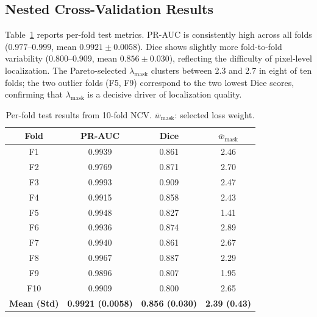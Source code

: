 \documentclass[final,5p,times,twocolumn,number]{elsarticle}
\begin{document}
\subsection{Nested Cross-Validation Results}
\label{subsec:ncv_results}

Table~\ref{tab:nested_cv} reports per-fold test metrics. PR-AUC is
consistently high across all folds ($0.977$--$0.999$, mean $0.9921 \pm
0.0058$). Dice shows slightly more fold-to-fold variability ($0.800$--$0.909$,
mean $0.856 \pm 0.030$), reflecting the difficulty of pixel-level localization.
The Pareto-selected $\lambda_{\text{mask}}$ clusters between 2.3 and 2.7 in
eight of ten folds; the two outlier folds (F5, F9) correspond to the two lowest
Dice scores, confirming that $\lambda_{\text{mask}}$ is a decisive driver of
localization quality.

\begin{table}[!t]
  \centering
  \caption{Per-fold test results from 10-fold NCV.
           $\overline{w}_{\text{mask}}$: selected loss weight.}
  \label{tab:nested_cv}
  \begin{tabular}{cccc}
    \toprule
    Fold & PR-AUC & Dice & $\overline{w}_{\text{mask}}$ \\
    \midrule
    F1  & 0.9939 & 0.861 & 2.46 \\
    F2  & 0.9769 & 0.871 & 2.70 \\
    F3  & 0.9993 & 0.909 & 2.47 \\
    F4  & 0.9915 & 0.858 & 2.43 \\
    F5  & 0.9948 & 0.827 & 1.41 \\
    F6  & 0.9936 & 0.874 & 2.89 \\
    F7  & 0.9940 & 0.861 & 2.67 \\
    F8  & 0.9967 & 0.887 & 2.29 \\
    F9  & 0.9896 & 0.807 & 1.95 \\
    F10 & 0.9909 & 0.800 & 2.65 \\
    \midrule
    \textbf{Mean (Std)} & \textbf{0.9921 (0.0058)} & \textbf{0.856 (0.030)} & \textbf{2.39 (0.43)} \\
    \bottomrule
  \end{tabular}
\end{table}
\end{document}
